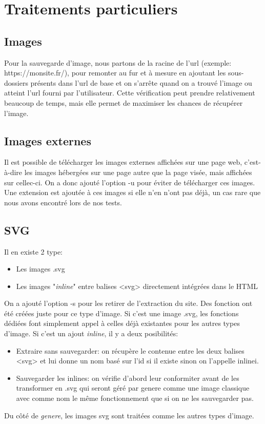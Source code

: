 \documentclass{article}
\begin{document}
\section{Traitements particuliers}

\subsection{Images}
Pour la sauvegarde d’image, nous partons de la racine de l’url (exemple: https://monsite.fr/), 
pour remonter au fur et à mesure en ajoutant les sous-dossiers présents dans l’url de base et on s’arrête quand on a trouvé l’image ou atteint l’url fourni par l’utilisateur. 
Cette vérification peut prendre relativement beaucoup de temps, mais elle permet de maximiser les chances de récupérer l’image.

\subsection{Images externes}
Il est possible de télécharger les images externes affichées sur une page web, 
c'est-à-dire les images hébergées sur une page autre que la page visée, mais affichées sur cellec-ci.
On a donc ajouté l'option -u pour éviter de télécharger ces images.
Une extension est ajoutée à ces images si elle n'en n'ont pas déjà, un cas rare que nous avons encontré lors de nos tests.
 
\subsection{SVG}
Il en existe 2 type:
\begin{itemize}  
  \item Les images .svg
  \item Les images "\textit{inline}" entre balises <svg> directement intégrées dans le HTML
\end{itemize}
On a ajouté l’option -s pour les retirer de l’extraction du site. Des fonction ont été créées juste pour ce type d'image. 
Si c’est une image .svg, les fonctions dédiées font simplement appel à celles déjà existantes pour les autres types d’image. 
Si c’est un ajout \textit{inline}, il y a deux posibilités:
\begin{itemize}  
  \item Extraire sans sauvegarder: on récupère le contenue entre les deux balises <svg> et lui donne un nom basé sur l’id si il existe sinon on l’appelle inline{i}.
  \item Sauvegarder les inlines: on vérifie d’abord leur conformiter avant de les transformer en .svg qui seront géré par genere comme une image classique avec comme nom le même fonctionnement que si on ne les sauvegarder pas.
\end{itemize}
Du côté de \textit{genere}, les images svg sont traitées comme les autres types d'image.
\end{document}
